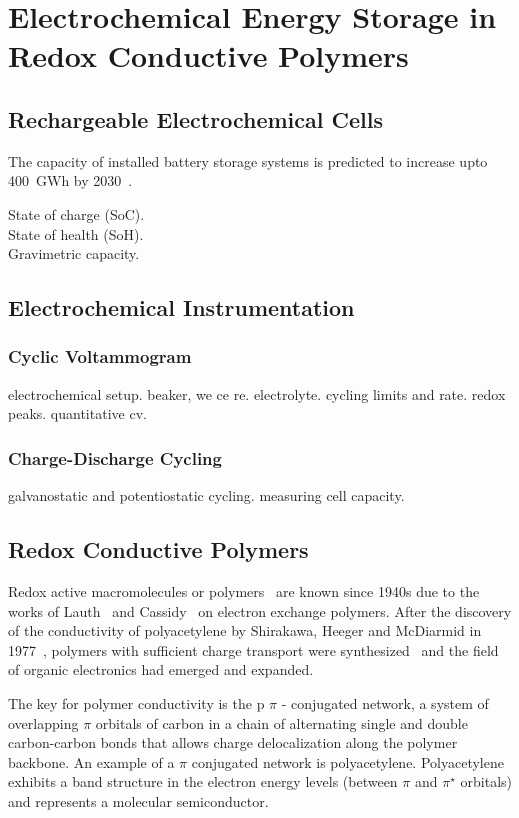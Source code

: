 \chapter{Electrochemical Energy Storage in Redox Conductive Polymers}

\section{Rechargeable Electrochemical Cells}

The capacity of installed battery storage systems is predicted to increase upto 400~GWh by 2030~\cite{Figgener_2020}.

State of charge (SoC).\\
State of health (SoH).\\
Gravimetric capacity.\\


\section{Electrochemical Instrumentation}
\subsection{Cyclic Voltammogram}
electrochemical setup. beaker, we ce re. electrolyte. cycling limits and rate. redox peaks. quantitative cv.
\subsection{Charge-Discharge Cycling}
galvanostatic and potentiostatic cycling. measuring cell capacity.

\section{Redox Conductive Polymers}

Redox active macromolecules or polymers~\cite{Staudinger_1920} are known since 1940s due to the works of Lauth~\cite{Lauth_1944} and Cassidy~\cite{Cassidy_1949} on electron exchange polymers. After the discovery of the conductivity of polyacetylene by Shirakawa, Heeger and McDiarmid in 1977~\cite{Shirakawa_1977}, polymers with sufficient charge transport were synthesized~\cite{} and the field of organic electronics had emerged and expanded. 

\par

The key for polymer conductivity is the p $\pi$ - conjugated network, a system of overlapping $\pi$ orbitals of carbon in a chain of alternating single and double carbon-carbon bonds that allows charge delocalization along the polymer backbone. An example of a $\pi$ conjugated network is polyacetylene. Polyacetylene exhibits a band structure in the electron energy levels (between $\pi$ and $\pi^\star$ orbitals) and represents a molecular semiconductor.

